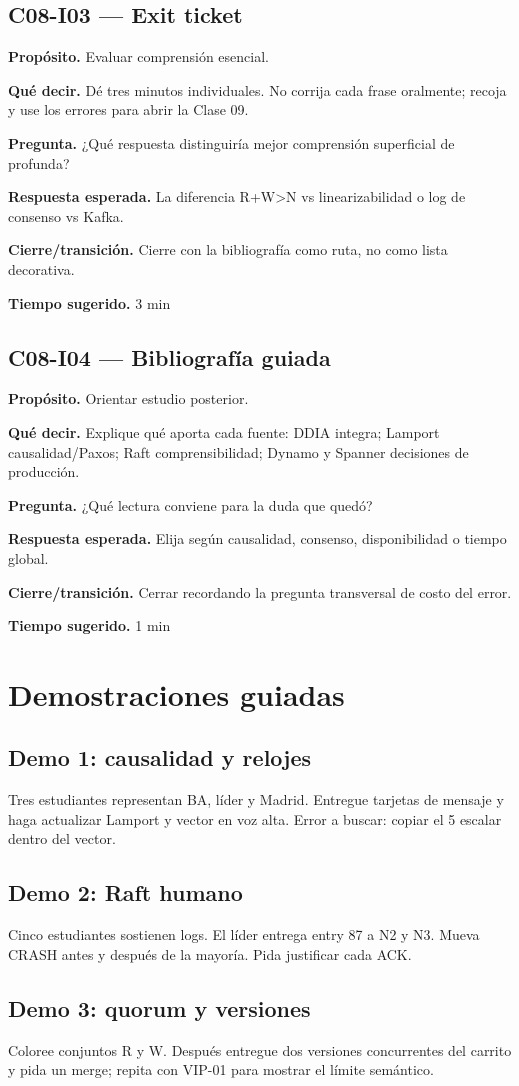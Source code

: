 \documentclass[variant=docente,cover=institutional,mode=screen]{ua-engineering-v6-article}
\newcommand{\FrameField}[2]{\par\noindent\textbf{#1.} #2\par}
\begin{document}
\subsection*{C08-I03 --- Exit ticket}
\FrameField{Propósito}{Evaluar comprensión esencial.}
\FrameField{Qué decir}{Dé tres minutos individuales. No corrija cada frase oralmente; recoja y use los errores para abrir la Clase 09.}
\FrameField{Pregunta}{¿Qué respuesta distinguiría mejor comprensión superficial de profunda?}
\FrameField{Respuesta esperada}{La diferencia R+W>N vs linearizabilidad o log de consenso vs Kafka.}
\FrameField{Cierre/transición}{Cierre con la bibliografía como ruta, no como lista decorativa.}
\FrameField{Tiempo sugerido}{3 min}

\subsection*{C08-I04 --- Bibliografía guiada}
\FrameField{Propósito}{Orientar estudio posterior.}
\FrameField{Qué decir}{Explique qué aporta cada fuente: DDIA integra; Lamport causalidad/Paxos; Raft comprensibilidad; Dynamo y Spanner decisiones de producción.}
\FrameField{Pregunta}{¿Qué lectura conviene para la duda que quedó?}
\FrameField{Respuesta esperada}{Elija según causalidad, consenso, disponibilidad o tiempo global.}
\FrameField{Cierre/transición}{Cerrar recordando la pregunta transversal de costo del error.}
\FrameField{Tiempo sugerido}{1 min}

\section{Demostraciones guiadas}
\subsection{Demo 1: causalidad y relojes}
Tres estudiantes representan BA, líder y Madrid. Entregue tarjetas de mensaje y haga actualizar Lamport y vector en voz alta. Error a buscar: copiar el 5 escalar dentro del vector.

\subsection{Demo 2: Raft humano}
Cinco estudiantes sostienen logs. El líder entrega entry 87 a N2 y N3. Mueva CRASH antes y después de la mayoría. Pida justificar cada ACK.

\subsection{Demo 3: quorum y versiones}
Coloree conjuntos R y W. Después entregue dos versiones concurrentes del carrito y pida un merge; repita con VIP-01 para mostrar el límite semántico.
\end{document}
